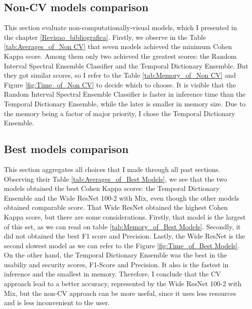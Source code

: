 




\FloatBarrier

\subsection{Non-CV models comparison}

This section evaluate non-computationally-visual models, which I presented in the chapter \ref{Revisao_bibliografica}. Firstly, we observe in the Table \ref{tab:Averages_of_Non CV} that seven models achieved the minimum Cohen Kappa score. Among them only two achieved the greatest scores: the Random Interval Spectral Ensemble Classifier and the Temporal Dictionary Ensemble. But they got similar scores, so I refer to the Table \ref{tab:Memory_of_Non CV} and Figure \ref{fig:Time_of_Non CV} to decide which to choose. It is visible that the Random Interval Spectral Ensemble Classifier is faster in inference time than the Temporal Dictionary Ensemble, while the later is smaller in memory size. Due to the memory being a factor of major priority, I chose the Temporal Dictionary Ensemble. 	 






\FloatBarrier

\subsection{Best models comparison}

This section aggregates all choices that I made through all past sections. Observing their Table \ref{tab:Averages_of_Best Models}, we see that the two models obtained the best Cohen Kappa scores: the Temporal Dictionary Ensemble and the Wide ResNet 100-2 with \gls{Mix}, even though the other models obtained comparable score. That Wide ResNet obtained the highest Cohen Kappa score, but there are some considerations. Firstly, that model is the largest of this set, as we can read on table \ref{tab:Memory_of_Best Models}. Secondly, it did not obtained the best F1 score and Precision. Lastly, the Wide ResNet is the second slowest model as we can refer to the Figure \ref{fig:Time_of_Best Models}. On the other hand, the Temporal Dictionary Ensemble was the best in the usabiliy and security scores, F1-Score and Precision. It also is the fastest in inference and the smallest in memory. Therefore, I conclude that the \gls{CV} approach lead to a better accuracy, represented by the Wide ResNet 100-2 with \gls{Mix}, but the non-\gls{CV} approach can be more useful, since it uses less resources and is less inconvenient to the user.


